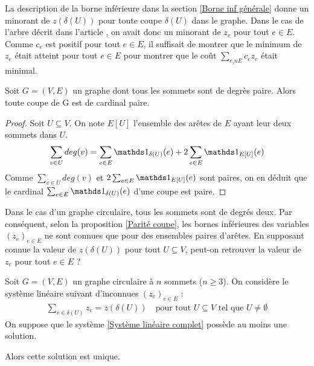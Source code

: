 La description de la borne inférieure dans la section \ref{Borne inf générale} donne un minorant de $z(\delta(U))$ pour toute coupe $\delta(U)$ dans le graphe. Dans le cas de l'arbre décrit dans l'article \cite{Benchimol2011}, on avait donc un minorant de $z_e$ pour tout $e \in E$. Comme $c_e$ est positif pour tout $e\in E$, il suffisait de montrer que le minimum de $z_e$ était atteint pour tout $e \in E$ pour montrer que le coût $\sum_{e _in E}c_ez_e$ était minimal.

\begin{prop}\label{Parité coupe}
Soit $G=(V,E)$ un graphe dont tous les sommets sont de degrès paire. Alors toute coupe de G est de cardinal paire.
\end{prop}

\begin{proof}
Soit $U \subseteq V$. On note $E[U]$ l'ensemble des arêtes de $E$ ayant leur deux sommets dans $U$.
$$
\sum_{v \in U} deg(v) = \sum_{e \in E}\Indic_{\delta(U)}(e)  + 2 \sum_{e \in E}\Indic_{E[U]}(e)
$$
Comme $\sum_{v \in U} deg(v)$ et $2 \sum_{e \in E}\Indic_{E[U]}(e)$ sont paires, on en déduit que le cardinal $\sum_{e \in E}\Indic_{\delta(U)}(e)$ d'une coupe est paire.
\end{proof}

Dans le cas d'un graphe circulaire, tous les sommets sont de degrés deux. Par conséquent, selon la proposition \ref{Parité coupe}, les bornes inférieures des variables $(z_e)_{e \in E}$ ne sont connues que pour des ensembles paires d'arêtes. En supposant connue la valeur de $z(\delta(U))$ pour tout $U \subseteq V$, peut-on retrouver la valeur de $z_e$ pour tout $e \in E$ ?

\begin{lem}\label{Changement de base}
Soit $G=(V,E)$ un graphe circulaire à $n$ sommets ($n \ge 3$). On considère le système linéaire suivant d'inconnues $(z_e)_{e \in E}$ :
\begin{gather}\label{Système linéaire complet}
  \sum_{e \in \delta(U)}z_e = z(\delta(U)) \quad \mbox{pour tout } U \subseteq V \mbox{ tel que } U \ne \emptyset
\end{gather}
On suppose que le système \ref{Système linéaire complet} possède au moins une solution.

Alors cette solution est unique.
\end{lem}

